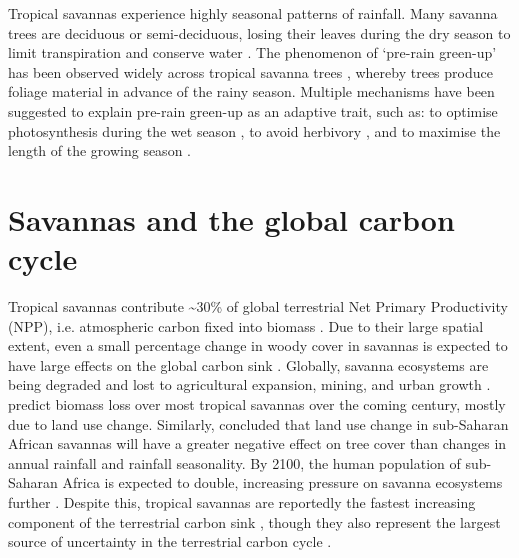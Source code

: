\begin{refsection}
Tropical savannas experience highly seasonal patterns of rainfall. Many savanna trees are deciduous or semi-deciduous, losing their leaves during the dry season to limit transpiration and conserve water \citep{Dahlin2016}. The phenomenon of `pre-rain green-up' has been observed widely across tropical savanna trees \citep{Archibald2007, Borchert1994, Williams1997, Ryan2017}, whereby trees produce foliage material in advance of the rainy season. Multiple mechanisms have been suggested to explain pre-rain green-up as an adaptive trait, such as: to optimise photosynthesis during the wet season \citep{Archibald2007}, to avoid herbivory \citep{Aide1988}, and to maximise the length of the growing season \citep{Scholes1993}. 

\section{Savannas and the global carbon cycle}
\label{background:ssec:carbon}

Tropical savannas contribute \textasciitilde{}30\% of global terrestrial Net Primary Productivity (NPP), i.e. atmospheric carbon fixed into biomass \citep{Grace2006}. Due to their large spatial extent, even a small percentage change in woody cover in savannas is expected to have large effects on the global carbon sink \citep{Williams2005}. Globally, savanna ecosystems are being degraded and lost to agricultural expansion, mining, and urban growth \citep{Parr2014}. \citet{Ross2021} predict biomass loss over most tropical savannas over the coming century, mostly due to land use change. Similarly, \citet{Aleman2016} concluded that land use change in sub-Saharan African savannas will have a greater negative effect on tree cover than changes in annual rainfall and rainfall seasonality. By 2100, the human population of sub-Saharan Africa is expected to double, increasing pressure on savanna ecosystems further \citep{Pison2017}. Despite this, tropical savannas are reportedly the fastest increasing component of the terrestrial carbon sink \citep{Sitch2015}, though they also represent the largest source of uncertainty in the terrestrial carbon cycle \citep{Ahlstrom2015}.


\end{refsection}
